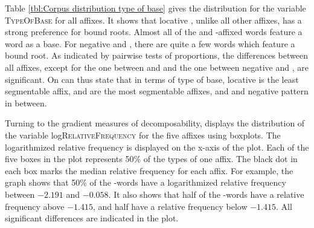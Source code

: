 Table \ref{tbl:Corpus distribution type of base} gives the distribution for the variable \textsc{TypeOfBase} for all affixes. It shows that locative , unlike all other affixes, has a strong preference for bound roots. Almost all of the  and -affixed words feature a word as a base. For negative  and , there are quite a few words which feature a bound root. As indicated by pairwise tests of proportions, the differences between all affixes, except for the one between  and  and the one between negative  and , are significant. On can thus state that in terms of type of base, locative  is the least segmentable affix,  and  are the most segmentable affixes, and  and negative  pattern in between.

\begin{table}
	\caption{Type of base by affix}
	\label{tbl:Corpus distribution type of base}
	

	
\end{table}



Turning to the gradient measures of decomposability,  displays the distribution of the variable log\textsc{RelativeFrequency} 
for the five affixes using boxplots. The logarithmized relative frequency is displayed on the x-axis of the plot.  Each of the five boxes in the plot represents 50\% of the types of one affix.  The black dot in each box marks the median relative frequency for each affix. For example, the graph shows that 50\% of the -words have a logarithmized relative frequency between $-2.191$ and $-0.058$. It also shows that half of the -words have a relative frequency above $-1.415$, and half have a relative frequency below $-1.415$. All significant differences are indicated in the plot.


